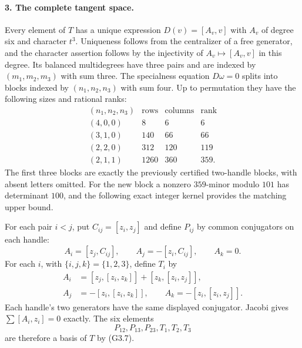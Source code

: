 \paragraph{3. The complete tangent space.}
Every element of $T$ has a unique expression
$D(v)=[A_v,v]$ with $A_v$ of degree six and character
$t^3$. Uniqueness follows from the centralizer of a
free generator, and the character assertion follows
by the injectivity of $A_v\mapsto[A_v,v]$ in this degree.
Its balanced multidegrees have three pairs and are
indexed by $(m_1,m_2,m_3)$ with sum three.
The specialness equation $D\omega=0$ splits into
blocks indexed by $(n_1,n_2,n_3)$ with sum four.
Up to permutation they have the following sizes and
rational ranks:
\[
\begin{array}{c|c|c|c}
 (n_1,n_2,n_3)&\text{rows}&\text{columns}&\text{rank}\\\hline
 (4,0,0)&8&6&6\\
 (3,1,0)&140&66&66\\
 (2,2,0)&312&120&119\\
 (2,1,1)&1260&360&359.
\end{array}                                               \tag{G3.7}
\]
The first three blocks are exactly the previously
certified two-handle blocks, with absent letters omitted.
For the new block a nonzero $359$-minor modulo $101$
has determinant $100$, and the following exact integer
kernel provides the matching upper bound.

For each pair $i<j$, put $C_{ij}=[z_i,z_j]$ and define
$P_{ij}$ by common conjugators on each handle:
\[
 A_i=[z_j,C_{ij}],\qquad A_j=-[z_i,C_{ij}],\qquad A_k=0.
\]
For each $i$, with $\{i,j,k\}=\{1,2,3\}$, define $T_i$ by
\[
 \begin{split}
 A_i&=[z_j,[z_i,z_k]]+[z_k,[z_i,z_j]],\\
 A_j&=-[z_i,[z_i,z_k]],\qquad
 A_k=-[z_i,[z_i,z_j]].
 \end{split}                                               \tag{G3.8}
\]
Each handle's two generators have the same displayed
conjugator. Jacobi gives $\sum[A_i,z_i]=0$ exactly.
The six elements
\[
                  P_{12},P_{13},P_{23},T_1,T_2,T_3
\]
are therefore a basis of $T$ by (G3.7).


